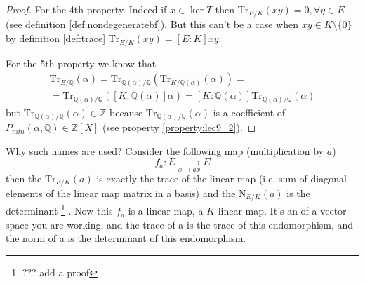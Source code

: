\begin{property}
\begin{proof}
    For the 4th property. Indeed if $x \in \ker T$ then
    $\mathrm{Tr}_{E/K}\left(xy\right) = 0, \forall y \in E$ (see
    definition \ref{def:nondegeneratebf}). But this
    can't be a case when $xy \in K \setminus \{0\}$ by definition
    \ref{def:trace} $\mathrm{Tr}_{E/K}\left(xy\right) =
    \left[E:K\right] xy$.

    For the 5th property we know that
    \begin{eqnarray}
    \mathrm{Tr}_{E/\mathbb{Q}}\left(\alpha\right) =
    \mathrm{Tr}_{\mathbb{Q}(\alpha)/\mathbb{Q}}\left(
    \mathrm{Tr}_{K/\mathbb{Q}(\alpha)}\left(\alpha\right)
    \right) =
    \nonumber \\
    =
    \mathrm{Tr}_{\mathbb{Q}(\alpha)/\mathbb{Q}}\left(
    \left[K:\mathbb{Q}(\alpha)\right] \alpha
    \right) =
    \left[K:\mathbb{Q}(\alpha)\right]
    \mathrm{Tr}_{\mathbb{Q}(\alpha)/\mathbb{Q}}\left(
     \alpha
    \right)
    \nonumber
    \end{eqnarray}
    but
    \(
    \mathrm{Tr}_{\mathbb{Q}(\alpha)/\mathbb{Q}}\left(
    \alpha
    \right) \in \mathbb{Z}
    \)
    because
    \(
    \mathrm{Tr}_{\mathbb{Q}(\alpha)/\mathbb{Q}}\left(
    \alpha
    \right)
    \) is a coefficient of $P_{min}\left(\alpha, \mathbb{Q}\right) \in
    \mathbb{Z}\left[X\right]$ (see property \ref{property:lec9_2}).     
  \end{proof}
  \label{property:lec9_norm_trace}
\end{property}

Why such names are used? Consider the following map
(multiplication by $a$)
\[
f_a: E \xrightarrow[x \to a x]{} E
\]
then the $\mathrm{Tr}_{E/K}\left(a\right)$ is exactly the trace of the
linear map (i.e. sum of diagonal elements of the linear map matrix in
a basis) and the $\mathrm{N}_{E/K}\left(a\right)$ is the
determinant
\footnote{
  ??? add a proof
}
. Now this $f_a$ is a linear map, a $K$-linear map. It's an
 of a vector space you are working, and the trace of a is
the trace of this endomorphism, and the norm of a is the determinant
of this endomorphism.  

